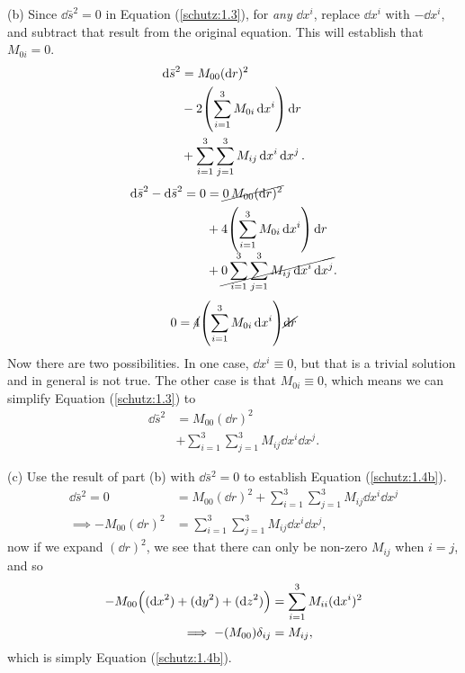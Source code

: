 \documentclass[gr-notes.tex]{subfiles}
\begin{document}
(b) Since $\dd{\bar{s}}^2 = 0$ in Equation (\ref{schutz:1.3}), for \emph{any} $\dd{x^i}$, replace $\dd{x^i}$ with $-\dd{x^i}$, and subtract that result from the original equation. This will establish that $M_{0i} = 0$.
%
\begin{align*}
  \dd{\bar{s}}^2 &=
  M_{00} (\dd{r})^2
  \\ &-
  2 \qty( \sum_{i=1}^3 M_{0i} \dd{x^i} ) \dd{r}
  \\ &+
  \sum_{i=1}^3 \sum_{j=1}^3 M_{ij} \dd{x^i} \dd{x^j}.
\end{align*}
%
\begin{align*}
  \dd{\bar{s}}^2 - \dd{\bar{s}}^2 = 0 &=
  \cancel{0 \, M_{00} (\dd{r})^2}
  \\ &+
  4 \qty( \sum_{i=1}^3 M_{0i} \dd{x^i} ) \dd{r}
  \\ &+
  \cancel{0 \sum_{i=1}^3 \sum_{j=1}^3 M_{ij} \dd{x^i} \dd{x^j}}.
\end{align*}
%
\begin{displaymath}
  0 = \cancel{4} \qty( \sum_{i=1}^3 M_{0i} \dd{x^i} ) \cancel{\dd{r}}
\end{displaymath}
%
Now there are two possibilities. In one case, $\dd{x^i} \equiv 0$, but that is a trivial solution and in general is not true. The other case is that $M_{0i} \equiv 0$, which means we can simplify Equation (\ref{schutz:1.3}) to
%
\begin{align*}
  \dd{\bar{s}}^2 &=
  M_{00} (\dd{r})^2
  \\ &+
  \sum_{i=1}^3 \sum_{j=1}^3 M_{ij} \dd{x^i} \dd{x^j}.
\end{align*}


(c) Use the result of part (b) with $\dd{\bar{s}}^2 = 0$ to establish Equation (\ref{schutz:1.4b}).
%
\begin{align*}
  \dd{\bar{s}}^2 = 0 &=
  M_{00} (\dd{r})^2 + \sum_{i=1}^3 \sum_{j=1}^3 M_{ij} \dd{x^i} \dd{x^j}
  \\ \implies
  -M_{00} (\dd{r})^2 &=
  \sum_{i=1}^3 \sum_{j=1}^3 M_{ij} \dd{x^i} \dd{x^j},
\end{align*}
%
now if we expand $(\dd{r})^2$, we see that there can only be non-zero $M_{ij}$ when $i = j$, and so
%
\begin{align*}
  -M_{00} \qty( (\dd{x}^2) + (\dd{y}^2) + (\dd{z}^2) ) &=
  \sum_{i=1}^3 M_{ii} (\dd{x^i})^2
  \\ \implies
  -(M_{00}) \delta_{ij} &=
  M_{ij},
\end{align*}
%
which is simply Equation (\ref{schutz:1.4b}).
\end{document}
